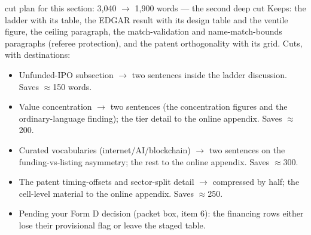 \begin{ericbox}{cut plan for this section: 3,040 $\to$ 1,900 words --- the second deep cut}
Keeps: the ladder with its table, the EDGAR result with its design table
and the ventile figure, the ceiling paragraph, the match-validation and
name-match-bounds paragraphs (referee protection), and the patent
orthogonality with its grid. Cuts, with destinations:
\begin{itemize}[nosep]
\item Unfunded-IPO subsection $\to$ two sentences inside the ladder
discussion. Saves $\approx$150 words.
\item Value concentration $\to$ two sentences (the concentration figures
and the ordinary-language finding); the tier detail to the online
appendix. Saves $\approx$200.
\item Curated vocabularies (internet/AI/blockchain) $\to$ two sentences
on the funding-vs-listing asymmetry; the rest to the online appendix.
Saves $\approx$300.
\item The patent timing-offsets and sector-split detail $\to$ compressed
by half; the cell-level material to the online appendix. Saves
$\approx$250.
\item Pending your Form D decision (packet box, item 6): the financing
rows either lose their provisional flag or leave the staged table.
\end{itemize}
\end{ericbox}
